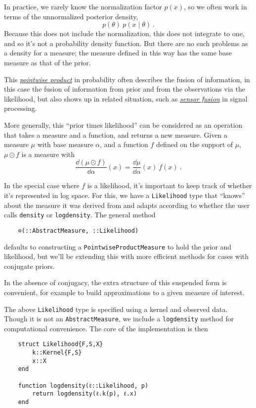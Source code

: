 \documentclass{juliacon}
\begin{document}
In practice, we rarely know the normalization factor $p(x)$, so we often work in terms of the unnormalized posterior density,
\[
p(\theta)\ p(x \mid \theta)\ .
\]
Because this does not include the normalization, this does not integrate to one, and so it's not a probability density function. But there are no such problems as a density for a measure; the measure defined in this way has the same base measure as that of the prior.

This \href{https://en.wikipedia.org/wiki/Pointwise_product}{\emph{pointwise product}} in probability often describes the fusion of information, in this case the fusion of information from prior and from the observations via the likelihood, but also shows up in related situation, such as \href{https://en.wikipedia.org/wiki/Sensor_fusion}{\emph{sensor fusion}} in signal processing.

More generally, this ``prior times likelihood'' can be considered as an operation that takes a measure and a function, and returns a new measure. Given a measure $\mu$ with base measure $\alpha$, and a function $f$ defined on the support of $\mu$, $\mu \odot f$ is a measure with
\[
\frac{\dd (\mu \odot f)}{\dd \alpha}(x) = \frac{\dd\mu}{\dd\alpha}(x)\ f(x)\ .
\]

In the special case where $f$ is a likelihood, it's important to keep track of whether it's represented in log space. For this, we have a \verb|Likelihood| type that ``knows'' about the measure it was derived from and adapts according to whether the user calls \verb|density| or \verb|logdensity|. The general method
\begin{verbatim}
    ⊙(::AbstractMeasure, ::Likelihood)
\end{verbatim}
defaults to constructing a \verb|PointwiseProductMeasure| to hold the prior and likelihood, but we'll be extending this with more efficient methods for cases with conjugate priors. 

In the absence of conjugacy, the extra structure of this suspended form is convenient, for example to build approximations to a given measure of interest.

The above \verb|Likelihood| type is specified using a kernel and observed data. Though it is not an \verb|AbstractMeasure|, we include a \verb|logdensity| method for computational convenience. The core of the implementation is then
\begin{verbatim}
    struct Likelihood{F,S,X}
        k::Kernel{F,S}
        x::X
    end

    function logdensity(ℓ::Likelihood, p) 
        return logdensity(ℓ.k(p), ℓ.x)
    end
\end{verbatim}
\end{document}
